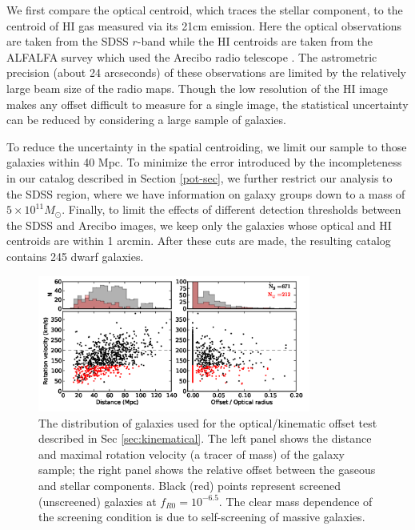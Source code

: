\documentclass{emulateapj}
\begin{document}
We first  compare the optical centroid, which traces
the stellar component, to the centroid of HI gas measured via its 21cm emission. 
Here the optical observations are taken from the SDSS $r$-band \citep{aba09}
while the HI centroids
are taken from the ALFALFA survey which used the Arecibo radio telescope
\citep{giovanelli2005, gio07, sai08,ken08,mar09}.
The astrometric precision (about 24 arcseconds) 
of these observations are limited by the
relatively large beam size of the radio maps.
Though the low resolution of the HI image makes any offset difficult to
measure for a single image,
the statistical uncertainty can be reduced by considering a large sample of
galaxies.

To  reduce the  uncertainty in the spatial centroiding,
we limit our sample to those galaxies within 40 Mpc.
To minimize the error introduced by the incompleteness in our catalog described
in Section \ref{pot-sec}, we further  restrict our analysis to the SDSS region,
where  we have information on galaxy groups down to a mass of
$5\times 10^{11}M_\odot$.  Finally, to limit the
effects of different detection thresholds between the SDSS and Arecibo
images, we keep only the galaxies whose optical and HI centroids are
within 1 arcmin.  After these cuts are made, the resulting catalog
contains 245 dwarf galaxies.


\begin{figure}
\begin{center}
  \includegraphics[width=0.8\textwidth]{figures/sec4_2_scatter.png}
  \caption{The distribution of galaxies used for the optical/kinematic offset
  test described in Sec
    \ref{sec:kinematical}.  The left panel shows the distance and maximal
    rotation velocity (a tracer of mass) of the galaxy sample; the right
    panel shows the relative offset between the gaseous and stellar components.
    Black (red) points represent screened (unscreened) galaxies at
    $f_{R0} = 10^{-6.5}$.  The clear mass dependence of the screening condition
    is due to self-screening of massive galaxies.}
  \label{offset-kin-den-1}
\end{center}
\end{figure}
\end{document}
